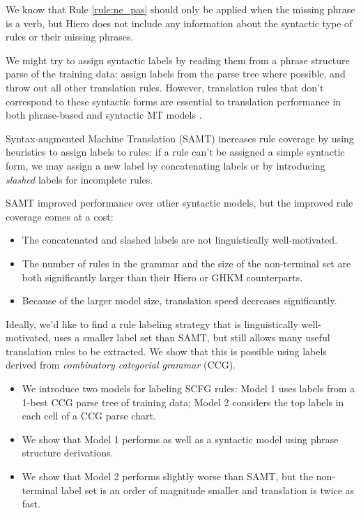 \documentclass{article}
\begin{document}
We know that Rule \ref{rule:ne_pas} should only be applied when the missing phrase is a verb, but Hiero does not include any information about the syntactic type of rules or their missing phrases.

We might try to assign syntactic labels by reading them from a phrase structure parse of the training data: assign labels from the parse tree where possible, and throw out all other translation rules. However, translation rules that don't correspond to these syntactic forms are essential to translation performance in both phrase-based \cite{koehn-och-marcu-2003} and syntactic MT models \cite{deneefe-syntax-and-phrase-mt}.

Syntax-augmented Machine Translation (SAMT) \cite{samt-wmt06} increases rule coverage by using heuristics to assign labels to rules: if a rule can't be assigned a simple syntactic form, we may assign a new label by concatenating labels or by introducing {\em slashed} labels for incomplete rules.

SAMT improved performance over other syntactic models, but the improved rule coverage comes at a cost:
\begin{itemize}
\item The concatenated and slashed labels are not linguistically well-motivated.
\item The number of rules in the grammar and the size of the non-terminal set are both significantly larger than their Hiero or GHKM counterparts.
\item Because of the larger model size, translation speed decreases significantly.
\end{itemize}

Ideally, we'd like to find a rule labeling strategy that is linguistically well-motivated, uses a smaller label set than SAMT, but still allows many useful translation rules to be extracted. We show that this is possible using labels derived from {\em combinatory categorial grammar} (CCG).
\begin{itemize}
\item We introduce two models for labeling SCFG rules: Model 1 uses labels from a 1-best CCG parse tree of training data; Model 2 considers the top labels in each cell of a CCG parse chart.
\item We show that Model 1 performs as well as a syntactic model using phrase structure derivations.
\item We show that Model 2 performs slightly worse than SAMT, but the non-terminal label set is an order of magnitude smaller and translation is twice as fast.
\end{itemize}
\end{document}
